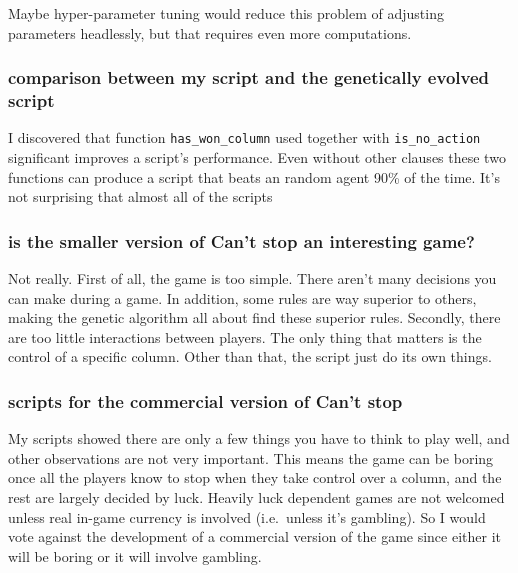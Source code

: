 \documentclass[]{article}
\begin{document}
Maybe hyper-parameter tuning would reduce this problem of adjusting
parameters headlessly, but that requires even more computations.

\subsubsection{comparison between my script and the genetically evolved
script}\label{comparison-between-my-script-and-the-genetically-evolved-script}

I discovered that function \texttt{has\_won\_column} used together with
\texttt{is\_no\_action} significant improves a script's performance.
Even without other clauses these two functions can produce a script that
beats an random agent 90\% of the time. It's not surprising that almost
all of the scripts

\subsubsection{is the smaller version of Can't stop an interesting
game?}\label{is-the-smaller-version-of-cant-stop-an-interesting-game}

Not really. First of all, the game is too simple. There aren't many
decisions you can make during a game. In addition, some rules are way
superior to others, making the genetic algorithm all about find these
superior rules. Secondly, there are too little interactions between
players. The only thing that matters is the control of a specific
column. Other than that, the script just do its own things.

\subsubsection{scripts for the commercial version of Can't
stop}\label{scripts-for-the-commercial-version-of-cant-stop}

My scripts showed there are only a few things you have to think to play
well, and other observations are not very important. This means the game
can be boring once all the players know to stop when they take control
over a column, and the rest are largely decided by luck. Heavily luck
dependent games are not welcomed unless real in-game currency is
involved (i.e.~unless it's gambling). So I would vote against the
development of a commercial version of the game since either it will be
boring or it will involve gambling.
\end{document}
